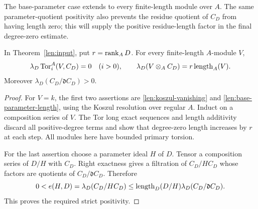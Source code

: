 The base-parameter case extends to every finite-length module over
$A$.  The same parameter-quotient positivity also prevents the residue
quotient of $C_D$ from having length zero; this will supply the positive
residue-length factor in the final degree-zero estimate.

\begin{corollary}\label{len:finite-length-base-change}
In Theorem~\ref{len:input}, put $r=\operatorname{rank}_A D$.
For every finite-length $A$-module $V$,
\[
 \lambda_D\operatorname{Tor}_i^A(V,C_D)=0\quad(i>0),\qquad
 \lambda_D(V\otimes_A C_D)=r\operatorname{length}_A(V).
\]
Moreover $\lambda_D(C_D/\mathfrak d C_D)>0$.
\end{corollary}

\begin{proof}
For $V=k$, the first two assertions are
\eqref{len:koszul-vanishing} and \eqref{len:base-parameter-length},
using the Koszul resolution over regular $A$.
Induct on a composition series of $V$.  The Tor long exact
sequences and length additivity discard all positive-degree terms
and show that degree-zero length increases by $r$ at each step.
All modules here have bounded primary torsion.

For the last assertion choose a parameter ideal $H$ of $D$.
Tensor a composition series of $D/H$ with $C_D$.
Right exactness gives a filtration of $C_D/HC_D$ whose factors
are quotients of $C_D/\mathfrak dC_D$.  Therefore
\[
 0<e(H,D)=\lambda_D(C_D/HC_D)
       \leq\operatorname{length}_D(D/H)\lambda_D(C_D/\mathfrak dC_D).
\]
This proves the required strict positivity.
\end{proof}
